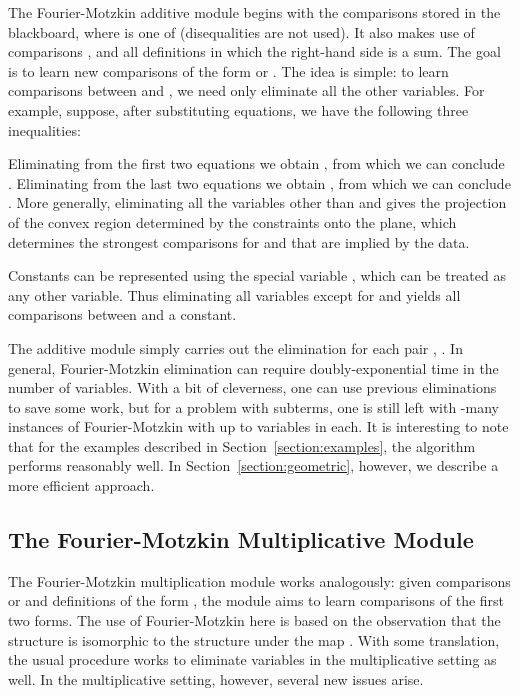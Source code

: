 \documentclass[runningheds]{llncs}
\begin{document}
The Fourier-Motzkin additive module begins with the comparisons  stored in the blackboard, where  is one of  (disequalities are not used). It also makes use of comparisons , and all definitions  in which the right-hand side is a sum. The goal is to learn new comparisons of the form  or . The idea is simple: to learn comparisons between  and , we need only eliminate all the other variables. 
For example, suppose, after substituting equations, we have the following three inequalities:

Eliminating  from the first two equations we obtain , from which we can conclude . Eliminating  from the last two equations we obtain , from which we can conclude . More generally, eliminating all the variables other than  and  gives the projection of the convex region determined by the constraints onto the  plane, which determines the strongest comparisons for  and  that are implied by the data.

Constants can be represented using the special variable , which
can be treated as any other variable. Thus eliminating all variables except for  and  yields all comparisons between  and a constant.





The additive module simply carries out the elimination for each pair
, . In general, Fourier-Motzkin elimination can
require doubly-exponential time in the number of variables.  With a bit of cleverness, one can use previous eliminations to save some work, but for a problem with  subterms, one is still left with -many instances of Fourier-Motzkin with up to  variables in each. 
It is interesting to note that for the examples described in
Section~\ref{section:examples}, the algorithm performs reasonably
well. In Section~\ref{section:geometric}, however, we describe a more
efficient approach.


\subsection{The Fourier-Motzkin Multiplicative Module}
\label{subsection:fm:multiplicative}

The Fourier-Motzkin multiplication module works analogously: given comparisons  or  and definitions of the form , the module aims to learn comparisons of the first two forms. The use of Fourier-Motzkin here is based on the observation that the structure  is isomorphic to the structure  under the map . With some translation, the usual procedure works to eliminate variables in the multiplicative setting as well. In the multiplicative setting, however, several new issues arise.
\end{document}

